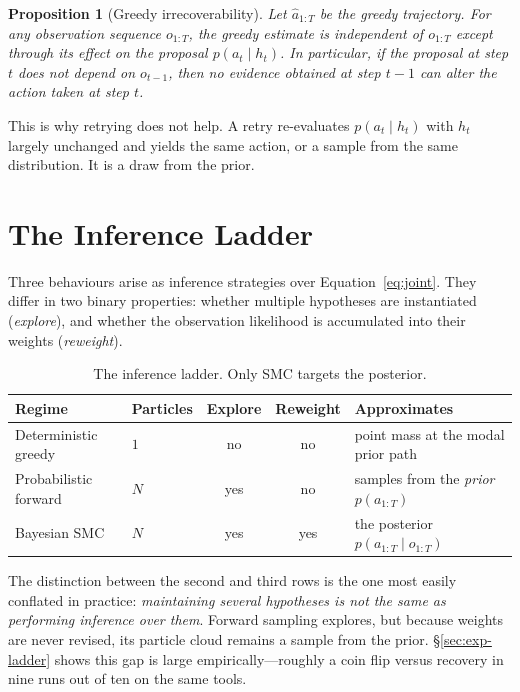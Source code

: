 \documentclass[11pt,a4paper]{article}
\newtheorem{proposition}{Proposition}
\begin{document}
\begin{proposition}[Greedy irrecoverability]
Let $\hat a_{1:T}$ be the greedy trajectory. For any observation sequence
$o_{1:T}$, the greedy estimate is independent of $o_{1:T}$ except through its
effect on the proposal $p(a_t\mid h_t)$. In particular, if the proposal at
step $t$ does not depend on $o_{t-1}$, then no evidence obtained at step $t-1$
can alter the action taken at step $t$.
\end{proposition}

This is why retrying does not help. A retry re-evaluates
$p(a_t \mid h_t)$ with $h_t$ largely unchanged and yields the same action, or a
sample from the same distribution. It is a draw from the prior.

\section{The Inference Ladder}
\label{sec:ladder}

Three behaviours arise as inference strategies over
Equation~\eqref{eq:joint}. They differ in two binary properties: whether
multiple hypotheses are instantiated (\emph{explore}), and whether the
observation likelihood is accumulated into their weights (\emph{reweight}).

\begin{table}[h]
\centering
\begin{tabular}{@{}llccl@{}}
\toprule
\textbf{Regime} & \textbf{Particles} & \textbf{Explore} & \textbf{Reweight} & \textbf{Approximates} \\
\midrule
Deterministic greedy   & $1$ & no  & no  & point mass at the modal prior path \\
Probabilistic forward  & $N$ & yes & no  & samples from the \emph{prior} $p(a_{1:T})$ \\
Bayesian SMC           & $N$ & yes & yes & the posterior $p(a_{1:T}\mid o_{1:T})$ \\
\bottomrule
\end{tabular}
\caption{The inference ladder. Only SMC targets the posterior.}
\label{tab:ladder}
\end{table}

The distinction between the second and third rows is the one most easily
conflated in practice: \emph{maintaining several hypotheses is not the same as
performing inference over them}. Forward sampling explores, but because weights
are never revised, its particle cloud remains a sample from the prior. \S\ref{sec:exp-ladder}
shows this gap is large empirically---roughly a coin flip versus recovery in
nine runs out of ten on the same tools.
\end{document}
